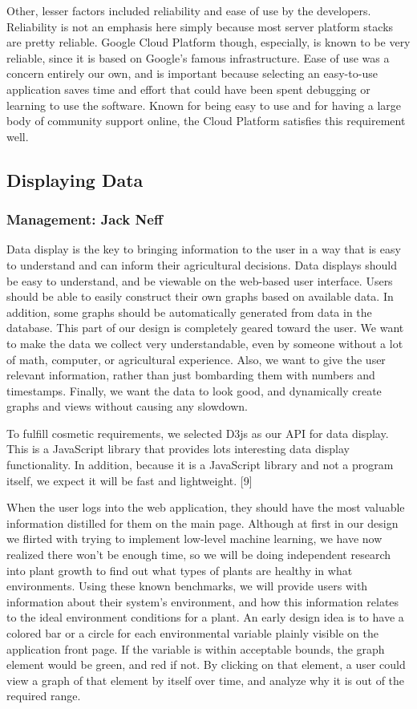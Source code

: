 \documentclass[IEEEtran,letterpaper,10pt,titlepage,fleqn,draftclsnofoot,onecolumn]{article}
\begin{document}
Other, lesser factors included reliability and ease of use by the developers. Reliability is not an emphasis here simply because most server platform stacks are pretty reliable. Google Cloud Platform though, especially, is known to be very reliable, since it is based on Google’s famous infrastructure. Ease of use was a concern entirely our own, and is important because selecting an easy-to-use application saves time and effort that could have been spent debugging or learning to use the software. Known for being easy to use and for having a large body of community support online, the Cloud Platform satisfies this requirement well. 

\subsection{Displaying Data}
\subsubsection{Management: Jack Neff}

Data display is the key to bringing information to the user in a way that is easy to understand and can inform their agricultural decisions. Data displays should be easy to understand, and be viewable on the web-based user interface. Users should be able to easily construct their own graphs based on available data. In addition, some graphs should be automatically generated from data in the database. This part of our design is completely geared toward the user. We want to make the data we collect very understandable, even by someone without a lot of math, computer, or agricultural experience. Also, we want to give the user relevant information, rather than just bombarding them with numbers and timestamps. Finally, we want the data to look good, and dynamically create graphs and views without causing any slowdown.

To fulfill cosmetic requirements, we selected D3js as our API for data display. This is a JavaScript library that provides lots interesting data display functionality. In addition, because it is a JavaScript library and not a program itself, we expect it will be fast and lightweight. [9]

When the user logs into the web application, they should have the most valuable information distilled for them on the main page. Although at first in our design we flirted with trying to implement low-level machine learning, we have now realized there won’t be enough time, so we will be doing independent research into plant growth to find out what types of plants are healthy in what environments. Using these known benchmarks, we will provide users with information about their system’s environment, and how this information relates to the ideal environment conditions for a plant. An early design idea is to have a colored bar or a circle for each environmental variable plainly visible on the application front page. If the variable is within acceptable bounds, the graph element would be green, and red if not. By clicking on that element, a user could view a graph of that element by itself over time, and analyze why it is out of the required range.
\end{document}
